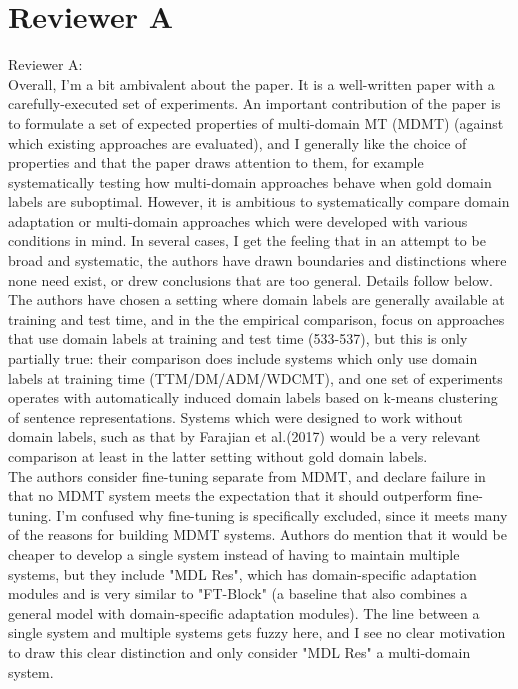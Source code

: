 \documentclass[12pt,times,a4paper,twoside]{article}
\theoremstyle{definition}
\begin{document}
\section*{Reviewer A}
Reviewer A:
\\
Overall, I'm a bit ambivalent about the paper. It is a well-written paper with a carefully-executed set of experiments. An important contribution of the paper is to formulate a set of expected properties of multi-domain MT (MDMT) (against which existing approaches are evaluated), and I generally like the choice of properties and that the paper draws attention to them, for example systematically testing how multi-domain approaches behave when gold domain labels are suboptimal. However, it is ambitious to systematically compare domain adaptation or multi-domain approaches which were developed with various conditions in mind. In several cases, I get the feeling that in an attempt to be broad and systematic, the authors have drawn boundaries and distinctions where none need exist, or drew conclusions that are too general. Details follow below.
\\
The authors have chosen a setting where domain labels are generally
available at training and test time, and in the the empirical comparison, focus on approaches that use domain labels at training and test time (533-537), but this is only partially true: their comparison does include systems which only use domain labels at training time (TTM/DM/ADM/WDCMT), and one set of experiments operates with automatically induced domain labels based on k-means clustering of sentence representations. Systems which were designed to work without domain labels, such as that by Farajian et al.(2017) would be a very relevant comparison at least in the latter setting without gold domain labels.
\\
The authors consider fine-tuning separate from MDMT, and declare failure in that no MDMT system meets the expectation that it should outperform fine-tuning. I'm confused why fine-tuning is specifically excluded, since it meets many of the reasons for building MDMT systems. Authors do mention that it would be cheaper to develop a single system instead of having to maintain multiple systems, but they include "MDL Res", which has domain-specific adaptation modules and is very similar to "FT-Block" (a baseline that also combines a general model with domain-specific adaptation modules). The line
between a single system and multiple systems gets fuzzy here, and I see no clear motivation to draw this clear distinction and only consider "MDL Res" a multi-domain system.
\end{document}
